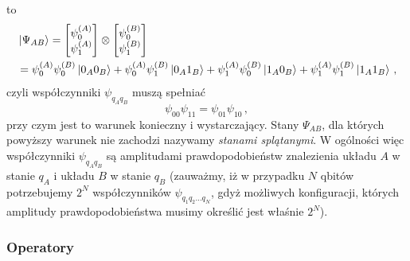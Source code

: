 \documentclass{myclass}
\begin{document}
\otimes {}\) to
\begin{equation*}
    \begin{split}
        &\ket{\Psi_{AB}} = \mqty[\psi_0^{(A)} \\ \psi_1^{(A)}]\otimes\mqty[\psi_0^{(B)} \\ \psi_1^{(B)}] \\
        &= \psi_0^{(A)}\psi_0^{(B)}\ket{0_A0_B} + \psi_0^{(A)}\psi_1^{(B)}\ket{0_A1_B} + \psi_1^{(A)}\psi_0^{(B)}\ket{1_A0_B} + \psi_1^{(A)}\psi_1^{(B)}\ket{1_A1_B}\,,
    \end{split}
\end{equation*}
czyli współczynniki \(\psi_{q_Aq_B}\) muszą spełniać
\begin{equation*}
    \psi_{00}\psi_{11} = \psi_{01}\psi_{10}\,,
\end{equation*}
przy czym jest to warunek konieczny i wystarczający. Stany \(\Psi_{AB}\), dla których powyższy
warunek nie zachodzi nazywamy \textit{stanami splątanymi}. W ogólności więc współczynniki
\(\psi_{q_Aq_B}\) są amplitudami prawdopodobieństw znalezienia układu \(A\) w stanie \(q_A\) i
układu \(B\) w stanie \(q_B\) (zauważmy, iż w przypadku \(N\) qbitów potrzebujemy \(2^N\)
współczynników \(\psi_{q_1q_2\ldots q_N}\), gdyż możliwych konfiguracji, których amplitudy
prawdopodobieństwa musimy określić jest właśnie \(2^N\)).

\subsubsection*{Operatory}
\end{document}

